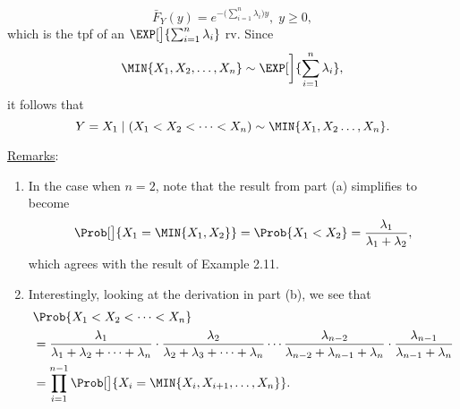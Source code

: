 \begin{Example}
\begin{enumerate}[(a)]
              \[ \bar{F}_Y(y)=e^{-\bigl(\sum_{i=1}^{n}\lambda_i\bigr)y},\; y\ge 0, \]
              which is the tpf of an $ \EXP[\big]{\sum_{i=1}^{n}\lambda_i} $ rv. Since
              \[ \MIN{X_1,X_2,\ldots,X_n}\sim \EXP[\bigg]{\sum_{i=1}^{n}\lambda_i}, \]
              it follows that
              \[ Y=X_1\mid(X_1<X_2<\cdots<X_n)\sim \MIN{X_1,X_2\ldots,X_n}. \]
    \end{enumerate}
    \tcblower{}
    \underline{Remarks}:
    \begin{enumerate}[(1)]
        \item In the case when $ n=2 $, note that the result from part (a) simplifies to become
              \[ \Prob[\big]{X_1=\MIN{X_1,X_2}}=\Prob{X_1<X_2}=\frac{\lambda_1}{\lambda_1+\lambda_2}, \]
              which agrees with the result of Example 2.11.
        \item Interestingly, looking at the derivation in part (b), we see that
              \begin{align*}
                   & \Prob{X_1<X_2<\cdots<X_n}                                                                                                 \\
                   & =\frac{\lambda_1}{\lambda_1+\lambda_2+\cdots+\lambda_n}\cdot \frac{\lambda_2}{\lambda_2+\lambda_3+\cdots+\lambda_n}\cdots
                  \frac{\lambda_{n-2}}{\lambda_{n-2}+\lambda_{n-1}+\lambda_n}\cdot \frac{\lambda_{n-1}}{\lambda_{n-1}+\lambda_n}               \\
                   & =\prod_{i=1}^{n-1}\Prob[\big]{X_i=\MIN{X_i,X_{i+1},\ldots,X_n}}.
              \end{align*}
    \end{enumerate}
\end{Example}
